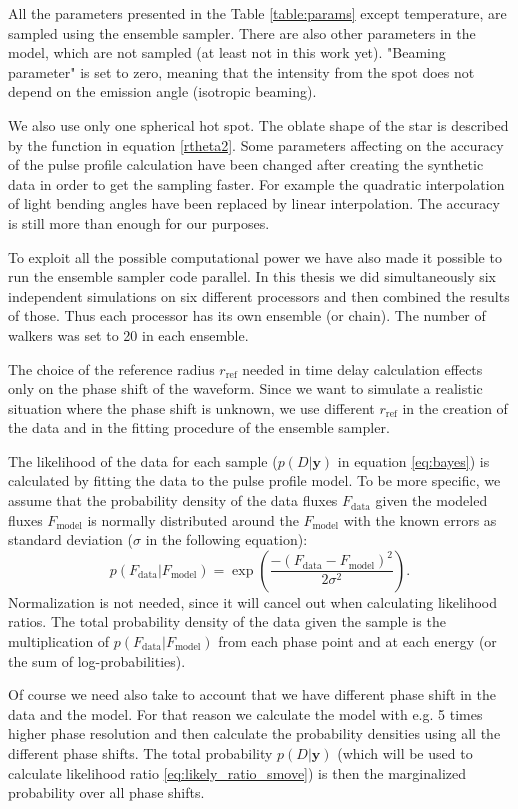 \documentclass{wihuri}
\def\be{\begin{equation}}
\def\ee{\end{equation}}
\begin{document}
All the parameters presented in the Table \ref{table:params} except temperature, are sampled using the ensemble sampler. There are also other parameters in the model, which are not sampled (at least not in this work yet). "Beaming parameter" is set to zero, meaning that the intensity from the spot does not depend on the emission angle (isotropic beaming). 

We also use only one spherical hot spot. The oblate shape of the star is described by the function in equation \ref{rtheta2}. Some parameters affecting on the accuracy of the pulse profile calculation have been changed after creating the synthetic data in order to get the sampling faster. For example the quadratic interpolation of light bending angles have been replaced by linear interpolation. The accuracy is still more than enough for our purposes. 

To exploit all the possible computational power we have also made it possible to run the ensemble sampler code parallel. In this thesis we did simultaneously six independent simulations on six different processors and then combined the results of those. Thus each processor has its own ensemble (or chain). The number of walkers was set to 20 in each ensemble. 
 

The choice of the reference radius $r_{\mathrm{ref}}$ needed in time delay calculation effects only on the phase shift of the waveform. Since we want to simulate a realistic situation where the phase shift is unknown, we use different $r_{\mathrm{ref}}$ in the creation of the data and in the fitting procedure of the ensemble sampler.  

The likelihood of the data for each sample ($p(D|\textbf{y})$ in equation \ref{eq:bayes}) is calculated by fitting the data to the pulse profile model. To be more specific, we assume that the probability density of the data fluxes $F_{\mathrm{data}}$ given the modeled fluxes $F_{\mathrm{model}}$  is normally distributed around the $F_{\mathrm{model}}$ with the known errors as standard deviation ($\sigma$ in the following equation): 
\be \label{eq:gaussprob}
p(F_{\mathrm{data}}|F_{\mathrm{model}}) = \exp (\frac{-(F_{\mathrm{data}}-F_{\mathrm{model}})^{2}}{2\sigma^{2}}).
\ee
Normalization is not needed, since it will cancel out when calculating likelihood ratios. The total probability density of the data given the sample is the multiplication of $p(F_{\mathrm{data}}|F_{\mathrm{model}})$ from each phase point and at each energy (or the sum of log-probabilities). 

Of course we need also take to account that we have different phase shift in the data and the model. For that reason we calculate the model with e.g. 5 times higher phase resolution and then calculate the probability densities using all the different phase shifts. The total probability $p(D|\textbf{y})$ (which will be used to calculate likelihood ratio \ref{eq:likely_ratio_smove}) is then the marginalized probability over all phase shifts. 
\end{document}
